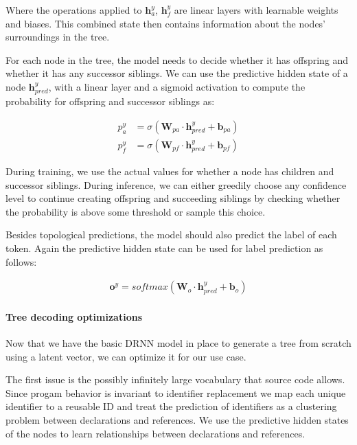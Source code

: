 Where the operations applied to $\mathbf{h}_a^y$, $\mathbf{h}_f^y$ are linear layers with learnable weights and biases. This combined state then contains information about the nodes' surroundings in the tree.



For each node in the tree, the model needs to decide whether it has offspring and whether it has any successor siblings. We can use the predictive hidden state of a node $\mathbf{h}^y_{pred}$, with a linear layer and a sigmoid activation to compute the probability for offspring and successor siblings as:

\begin{align}
    p_a^y &= \sigma(\mathbf{W}_{pa} \cdot \mathbf{h}_{pred}^y + \mathbf{b}_{pa}) \label{eq:prob_ancestral} \\
    p_f^y &= \sigma(\mathbf{W}_{pf} \cdot \mathbf{h}_{pred}^y + \mathbf{b}_{pf})\label{eq:prob_fraternal}
\end{align}

During training, we use the actual values for whether a node has children and successor siblings. 
During inference, we can either greedily choose any confidence level to continue creating offspring and succeeding siblings by checking whether the probability is above some threshold or sample this choice. 



Besides topological predictions, the model should also predict the label of each token. Again the predictive hidden state can be used for label prediction as follows:

\begin{align}
    \mathbf{o}^y =  softmax\left(\mathbf{W}_o \cdot \mathbf{h}_{pred}^y + \mathbf{b}_{o}\right) \label{eq:label_pred}
\end{align}


\paragraph{Tree decoding optimizations} Now that we have the basic DRNN model \cite{alvarezmelis2017tree} in place to generate a tree from scratch using a latent vector, we can optimize it for our use case. 



The first issue is the possibly infinitely large vocabulary that source code allows. Since progam behavior is invariant to identifier replacement we map each unique identifier to a reusable ID \cite{tufano2019learning} and treat the prediction of identifiers as a clustering problem between declarations and references. We use the predictive hidden states of the nodes to learn relationships between declarations and references.  



